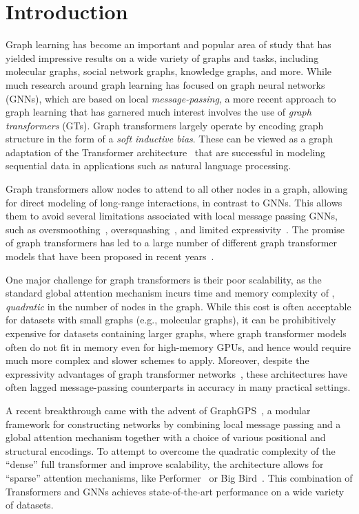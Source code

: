 \documentclass{article}
\theoremstyle{plain}
\theoremstyle{definition}
\theoremstyle{remark}
\begin{document}
\section{Introduction}
Graph learning has become an important and popular area of study that has yielded impressive results on a wide variety of graphs and tasks, including molecular graphs, social network graphs, knowledge graphs, and more. 
While much research around graph learning has focused on graph neural networks (GNNs), which are based on local \emph{message-passing}, a more recent approach to graph learning that has garnered much interest involves the use of \emph{graph transformers} (GTs). Graph transformers largely operate by encoding graph structure in the form of a \emph{soft inductive bias}. These can be viewed as a graph adaptation of the Transformer architecture~\citep{VaswaniSPUJGKP17} that are successful in modeling sequential data in applications such as natural language processing. 

Graph transformers allow nodes to attend to all other nodes in a graph, allowing for direct modeling of long-range interactions, in contrast to GNNs. This allows them to avoid several limitations associated with local message passing GNNs, such as oversmoothing~\citep{OonoSuzuki20}, oversquashing~\citep{AlonYahav21, ToppingGCDB22}, and limited expressivity~\citep{morris2019weisfeiler, xu2018powerful}. The promise of graph transformers has led to a large number of different graph transformer models that have been proposed in recent years~\citep{DwivediBresson21, kreuzer2021rethinking, Ying2021DoTR, MialonCSM21}.  

One major challenge for graph transformers is their poor scalability, as the standard global attention mechanism incurs time and memory complexity of , \emph{quadratic} in the number of nodes in the graph. While this cost is often acceptable for datasets with small graphs (e.g., molecular graphs), it can be prohibitively expensive for datasets containing larger graphs, where graph transformer models often do not fit in memory even for high-memory GPUs, and hence would require much more complex and slower schemes to apply.  Moreover, despite the expressivity advantages of graph transformer networks~\citep{kreuzer2021rethinking}, these architectures have often lagged message-passing counterparts in accuracy in many practical settings.

A recent breakthrough came with the advent of GraphGPS~\citep{RampasekGDLWB22}, a modular framework for constructing networks by combining local message passing and a global attention mechanism together with a choice of various positional and structural encodings. To attempt to overcome the quadratic complexity of the ``dense'' full transformer and improve scalability, the architecture allows for ``sparse'' attention mechanisms, like Performer~\citep{ChoromanskiLDSG21} or Big Bird~\citep{ZaheerGDAAOPRWY20}.
This combination of Transformers and GNNs achieves state-of-the-art performance on a wide variety of datasets.
\end{document}
